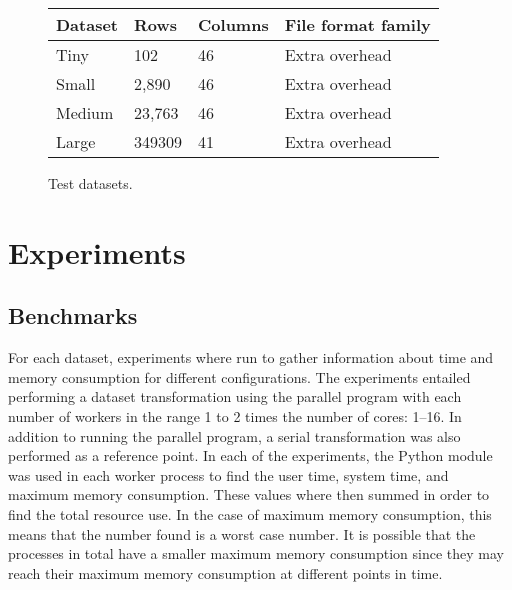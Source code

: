 \begin{figure}[ht]
\centering
\begin{tabular}{|l|l|l|l|}
\hline
Dataset & Rows   & Columns & File format family \\ \hline
Tiny    & 102    & 46      & Extra overhead     \\ \hline
Small   & 2,890  & 46      & Extra overhead     \\ \hline
Medium  & 23,763 & 46      & Extra overhead     \\ \hline
Large  & 349309 & 41      & Extra overhead     \\ \hline
\end{tabular}
\label{fig:test_datasets}
\caption{Test datasets.}
\end{figure}

\section{Experiments}
\subsection{Benchmarks}
For each dataset, experiments where run to gather information about time and memory consumption for different configurations.
The experiments entailed performing a dataset transformation using the parallel program with each number of workers in the range 1 to 2 times the number of cores: 1--16.
In addition to running the parallel program, a serial transformation was also performed as a reference point.
In each of the experiments, the Python  module was used in each worker process to find the user time, system time, and maximum memory consumption.
These values where then summed in order to find the total resource use. In the case of maximum memory consumption, this means that the number found is a worst case
number. It is possible that the processes in total have a smaller maximum memory consumption since they may reach their maximum memory consumption at different
points in time.


